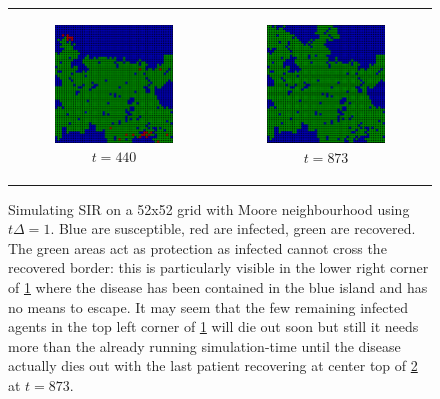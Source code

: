 \begin{figure}
\begin{center}
\begin{tabular}{c c}
		\begin{subfigure}[b]{0.4\textwidth}
			\centering
			\includegraphics[width=.6\textwidth, angle=0]{./../shared/fig/spatial/SIR_spatial_52x52_440time.png}
			\caption{$t = 440$}
			\label{fig:sir_spatial_440}
		\end{subfigure}
		
		& 
		
		\begin{subfigure}[b]{0.4\textwidth}
			\centering
			\includegraphics[width=.6\textwidth, angle=0]{./../shared/fig/spatial/SIR_spatial_52x52_873time.png}
			\caption{$t = 873$}
			\label{fig:sir_spatial_873}
		\end{subfigure}
	\end{tabular}
	
	\caption{Simulating SIR on a 52x52 grid with Moore neighbourhood using $t\Delta = 1$. Blue are susceptible, red are infected, green are recovered. The green areas act as protection as infected cannot cross the recovered border: this is particularly visible in the lower right corner of \ref{fig:sir_spatial_440} where the disease has been contained in the blue island and has no means to escape. It may seem that the few remaining infected agents in the top left corner of \ref{fig:sir_spatial_440} will die out soon but still it needs more than the already running simulation-time until the disease actually dies out with the last patient recovering at center top of \ref{fig:sir_spatial_873} at $t = 873$.} 
	\label{fig:sir_spatial}
\end{center}
\end{figure}

